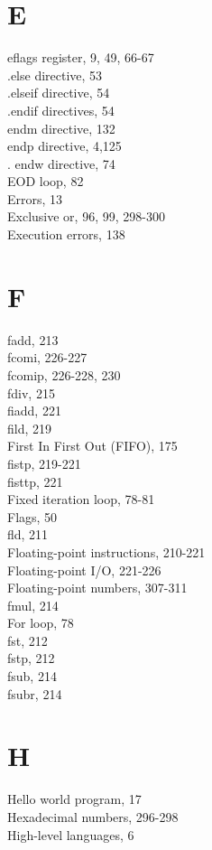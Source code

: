 \documentclass[10pt]{article}
\begin{document}
\section*{E}
eflags register, 9, 49, 66-67\\
.else directive, 53\\
.elseif directive, 54\\
.endif directives, 54\\
endm directive, 132\\
endp directive, 4,125\\
. endw directive, 74\\
EOD loop, 82\\
Errors, 13\\
Exclusive or, 96, 99, 298-300\\
Execution errors, 138

\section*{F}
fadd, 213\\
fcomi, 226-227\\
fcomip, 226-228, 230\\
fdiv, 215\\
fiadd, 221\\
fild, 219\\
First In First Out (FIFO), 175\\
fistp, 219-221\\
fisttp, 221\\
Fixed iteration loop, 78-81\\
Flags, 50\\
fld, 211\\
Floating-point instructions, 210-221\\
Floating-point I/O, 221-226\\
Floating-point numbers, 307-311\\
fmul, 214\\
For loop, 78\\
fst, 212\\
fstp, 212\\
fsub, 214\\
fsubr, 214

\section*{H}
Hello world program, 17\\
Hexadecimal numbers, 296-298\\
High-level languages, 6
\end{document}

